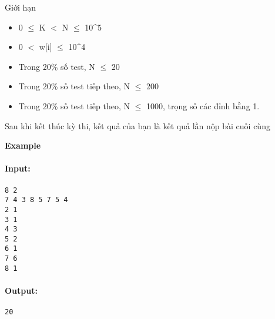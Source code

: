 Giới hạn
\begin{itemize}
	\item     0  $\le$  K $<$ N  $\le$  10^5   
	\item     0 $<$ w[i]  $\le$  10^4   
	\item     Trong 20\% số test, N  $\le$  20   
	\item     Trong 20\% số test tiếp theo, N  $\le$  200   
	\item     Trong 20\% số test tiếp theo, N  $\le$  1000, trọng số các đỉnh bằng 1.   
\end{itemize}

    Sau khi kết thúc kỳ thi, kết quả của bạn là kết quả lần nộp bài cuối cùng   

\textbf{}
\textbf{    Example   }
\paragraph{   Input:  }
\begin{verbatim}
8 2
7 4 3 8 5 7 5 4
2 1
3 1
4 3
5 2
6 1
7 6
8 1\end{verbatim}

\paragraph{   Output:  }
\begin{verbatim}
20\end{verbatim}